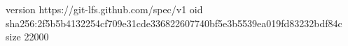 version https://git-lfs.github.com/spec/v1
oid sha256:2f5b5b4132254cf709e31cde336822607740bf5e3b5539ea019fd83232bdf84c
size 22000

